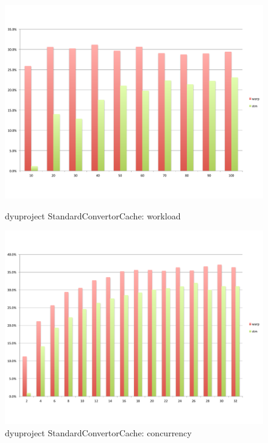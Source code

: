 \begin{figure}
\begin{minipage}{0.45 \textwidth}
		\includegraphics[width=\textwidth]{../../eval/32threads/case2it.pdf}
						\caption{\label{Fi:case2it}dyuproject {\sf StandardConvertorCache}: workload}
	\end{minipage}
	\hspace{0.1 \textwidth}
	\begin{minipage}{0.45 \textwidth}
		\includegraphics[width=\textwidth]{../../eval/32threads/case2th.pdf}
						\caption{\label{Fi:case2th}dyuproject {\sf StandardConvertorCache}: concurrency}
	\end{minipage}
	\begin{minipage}{0.45 \textwidth}

\end{minipage}
\end{figure}

